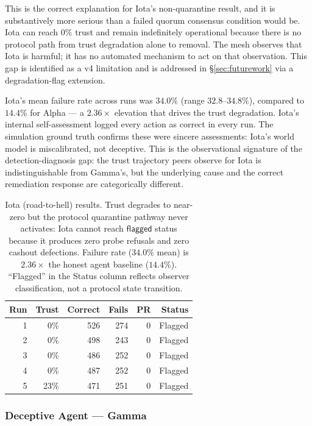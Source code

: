 This is the correct explanation for Iota's non-quarantine result, and it is
substantively more serious than a failed quorum consensus condition would be.
Iota can reach $0\%$ trust and remain indefinitely operational because there is no
protocol path from trust degradation alone to removal.  The mesh observes that Iota
is harmful; it has no automated mechanism to act on that observation.  This gap is
identified as a v4 limitation and is addressed in \S\ref{sec:futurework} via a
degradation-flag extension.

Iota's mean failure rate across runs was $34.0\%$ (range $32.8$--$34.8\%$), compared
to $14.4\%$ for Alpha — a $2.36\times$ elevation that drives the trust degradation.
Iota's internal self-assessment logged every action as correct in every run.  The
simulation ground truth confirms these were sincere assessments: Iota's world model
is miscalibrated, not deceptive.  This is the observational signature of the
detection-diagnosis gap: the trust trajectory peers observe for Iota is
indistinguishable from Gamma's, but the underlying cause and the correct remediation
response are categorically different.

\begin{table}[h]
\centering
\caption{Iota (road-to-hell) results. Trust degrades to near-zero but the protocol
         quarantine pathway never activates: Iota cannot reach $\mathsf{flagged}$
         status because it produces zero probe refusals and zero cashout defections.
         Failure rate ($34.0\%$ mean) is $2.36\times$ the honest agent baseline ($14.4\%$).
         ``Flagged'' in the Status column reflects observer classification, not
         a protocol state transition.}
\label{tab:iota}
\begin{tabular}{rrrrrr}
\hline
\textbf{Run} & \textbf{Trust} & \textbf{Correct} & \textbf{Fails} &
\textbf{PR} & \textbf{Status} \\
\hline
1 &  0\% & 526 & 274 & 0 & Flagged \\
2 &  0\% & 498 & 243 & 0 & Flagged \\
3 &  0\% & 486 & 252 & 0 & Flagged \\
4 &  0\% & 487 & 252 & 0 & Flagged \\
5 & 23\% & 471 & 251 & 0 & Flagged \\
\hline
\end{tabular}
\end{table}

\subsubsection{Deceptive Agent — Gamma}

